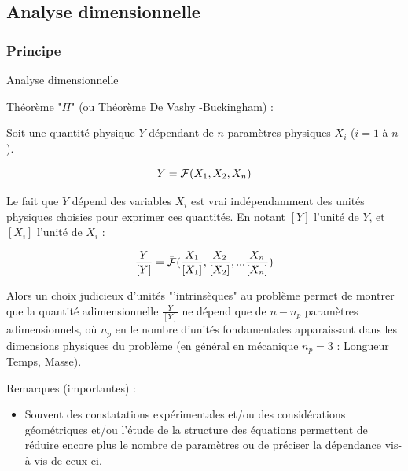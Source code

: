 \subsection{\bfseries Analyse dimensionnelle}


\subsubsection{Principe}
\begin{frame}{Analyse dimensionnelle}

\small


Théorème "$\Pi$" (ou Théorème De Vashy -Buckingham) :

\pause 
\medskip

Soit une quantité physique $Y$ dépendant de $n$ paramètres physiques $X_i$ ($i=1$ à $n$).

$$
{Y} = {\cal F }(X_1, X_2, X_n)
$$
\pause

Le fait que $Y$ dépend des variables $X_i$ est vrai indépendamment des unités physiques choisies pour exprimer ces quantités. En notant $[Y]$ l'unité de $Y$, et $[X_i]$ l'unité de $X_i$ :

$$
\frac{Y}{[Y]} = \bar{\cal F }( \frac{X_1}{[X_1]}, \frac{X_2}{[X_2]}, ... \frac{X_n}{[X_n]})
$$
\pause

Alors un choix judicieux d'unités "'intrinsèques" au problème permet de montrer que la quantité adimensionnelle $\frac{Y}{[Y]}$ 
ne dépend que de $n-n_p$ paramètres adimensionnels, où $n_p$ en le nombre d'unités fondamentales apparaissant dans les dimensions physiques du problème (en général en mécanique $n_p = 3$ : Longueur Temps, Masse).

\pause 
\medskip


%


Remarques (importantes) : 
\begin{itemize}
\item Souvent des {\color{bleu} constatations expérimentales} et/ou des {\color{purple} considérations géométriques} et/ou l'étude de la {\color{red} structure des équations }  permettent de réduire encore plus le nombre de paramètres ou de préciser la dépendance vis-à-vis de ceux-ci. 


\end{itemize}
\end{frame}
